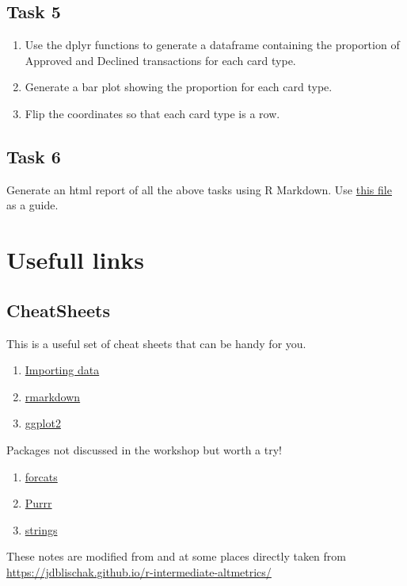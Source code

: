 \documentclass[
]{book}
\providecommand{\tightlist}{%
  \setlength{\itemsep}{0pt}\setlength{\parskip}{0pt}}
\begin{document}
\hypertarget{task-5}{%
\section{Task 5}\label{task-5}}

\begin{enumerate}
\def\labelenumi{\arabic{enumi}.}
\tightlist
\item
  Use the dplyr functions to generate a dataframe containing the proportion of Approved and Declined transactions for each card type.
\item
  Generate a bar plot showing the proportion for each card type.
\item
  Flip the coordinates so that each card type is a row.
\end{enumerate}

\hypertarget{task-6}{%
\section{Task 6}\label{task-6}}

Generate an html report of all the above tasks using R Markdown. Use \href{data/case_study_theme.html}{this file} as a guide.

\hypertarget{usefull-links}{%
\chapter{Usefull links}\label{usefull-links}}

\hypertarget{cheatsheets}{%
\section{CheatSheets}\label{cheatsheets}}

This is a useful set of cheat sheets that can be handy for you.

\begin{enumerate}
\def\labelenumi{\arabic{enumi}.}
\tightlist
\item
  \href{img/data-import.pdf}{Importing data}
\item
  \href{img/rmarkdown-2.0.pdf}{rmarkdown}
\item
  \href{img/ggplot2-cheatsheet.pdf}{ggplot2}
\end{enumerate}

Packages not discussed in the workshop but worth a try!

\begin{enumerate}
\def\labelenumi{\arabic{enumi}.}
\tightlist
\item
  \href{img/factors.pdf}{forcats}
\item
  \href{img/purrr.pdf}{Purrr}
\item
  \href{img/strings.pdf}{strings}
\end{enumerate}

These notes are modified from and at some places directly taken from \url{https://jdblischak.github.io/r-intermediate-altmetrics/}

  
\end{document}
